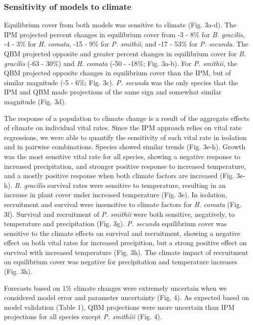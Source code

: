 \documentclass[12pt,]{article}
\begin{document}
\subsubsection{Sensitivity of models to
climate}\label{sensitivity-of-models-to-climate}

Equilibrium cover from both models was sensitive to climate (Fig. 3a-d).
The IPM projected percent changes in equilibrium cover from -3 - 8\% for
\emph{B. gracilis}, -4 - 3\% for \emph{H. comata}, -15 - 9\% for
\emph{P. smithii}, and -17 - 53\% for \emph{P. secunda}. The QBM
projected opposite and greater percent changes in equilibrium cover for
\emph{B. gracilis} (-63 - 30\%) and \emph{H. comata} (-50 - -18\%; Fig.
3a-b). For \emph{P. smithii}, the QBM projected opposite changes in
equilibrium cover than the IPM, but of similar magnitude (-5 - 6\%; Fig.
3c). \emph{P. secunda} was the only species that the IPM and QBM made
projections of the same sign and somewhat similar magnitude (Fig. 3d).

The response of a population to climate change is a result of the
aggregate effects of climate on individual vital rates. Since the IPM
approach relies on vital rate regressions, we were able to quantify the
sensitivity of each vital rate in isolation and in pairwise
combinations. Species showed similar trends (Fig. 3e-h). Growth was the
most sensitive vital rate for all species, showing a negative response
to increased precipitation, and stronger positive response to increased
temperature, and a mostly positive response when both climate factors
are increased (Fig. 3e-h). \emph{B. gracilis} survival rates were
sensitive to temperature, resulting in an increase in plant cover under
increased temperature (Fig. 3e). In isolation, recruitment and survival
were insensitive to climate factors for \emph{H. comata} (Fig. 3f).
Survival and recruitment of \emph{P. smithii} were both sensitive,
negatively, to temperature and precipitation (Fig. 3g). \emph{P.
secunda} equilibrium cover was sensitive to the climate effects on
survival and recruitment, showing a negative effect on both vital rates
for increased precipition, but a strong positive effect on survival with
increased temperature (Fig. 3h). The climate impact of recruitment on
equilibrium cover was negative for precipitation and temperature
increases (Fig. 3h).

Forecasts based on 1\% climate changes were extremely uncertain when we
considered model error and parameter uncertainty (Fig. 4). As expected
based on model validation (Table 1), QBM projections were more uncertain
than IPM projections for all species except \emph{P. smithiii} (Fig. 4).
\end{document}
